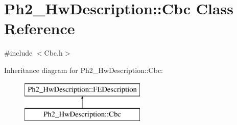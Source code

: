 \hypertarget{class_ph2___hw_description_1_1_cbc}{\section{Ph2\-\_\-\-Hw\-Description\-:\-:Cbc Class Reference}
\label{class_ph2___hw_description_1_1_cbc}
}


{\ttfamily \#include $<$Cbc.\-h$>$}

Inheritance diagram for Ph2\-\_\-\-Hw\-Description\-:\-:Cbc\-:\begin{figure}[H]
\begin{center}
\leavevmode
\includegraphics[height=2.000000cm]{class_ph2___hw_description_1_1_cbc}
\end{center}
\end{figure}
